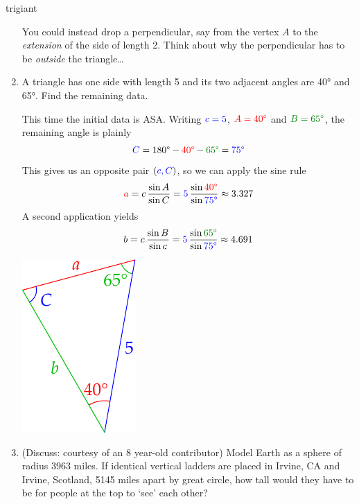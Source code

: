 \begin{examples}{}{trigiant}
\begin{enumerate}
		You could instead drop a perpendicular, say from the vertex $A$ to the \emph{extension} of the side of length 2. Think about why the perpendicular has to be \emph{outside} the triangle\ldots

		\goodbreak
		
		\item A triangle has one side with length 5 and its two adjacent angles are \ang{40} and \ang{65}. Find the remaining data.\par
		\begin{minipage}[t]{0.69\linewidth}\vspace{-5pt}
			This time the initial data is ASA. Writing $\textcolor{blue}{c=5}$, $\textcolor{red}{A=\ang{40}}$ and $\textcolor{Green}{B=\ang{65}}$, the remaining angle is plainly 
			\[
				\textcolor{blue}{C}=\ang{180}-\textcolor{red}{\ang{40}}-\textcolor{Green}{\ang{65}}=\textcolor{blue}{\ang{75}}
			\]
			This gives us an opposite pair $(\textcolor{blue}{c,C})$, so we can apply the sine rule
			\[
				\textcolor{red}{a}=c\,\frac{\sin A}{\sin C}=\textcolor{blue}{5}\,\frac{\sin\textcolor{red}{\ang{40}}}{\sin\textcolor{blue}{\ang{75}}}\approx 3.327
			\]
			A second application yields
			\[
				b=c\,\frac{\sin B}{\sin c}=\textcolor{blue}{5}\,\frac{\sin\textcolor{Green}{\ang{65}}}{\sin\textcolor{blue}{\ang{75}}}\approx 4.691
			\]
		\end{minipage}
		\hfill
		\begin{minipage}[t]{0.3\linewidth}\vspace{-5pt}
			\flushright\includegraphics{exasa}
		\end{minipage}
		
		\item\label{ex:trigiant3} (Discuss: courtesy of an 8 year-old contributor) Model Earth as a sphere of radius 3963 miles. If identical vertical ladders are placed in Irvine, CA and Irvine, Scotland, 5145 miles apart by great circle, how tall would they have to be for people at the top to `see' each other?
	\end{enumerate}
\end{examples}




